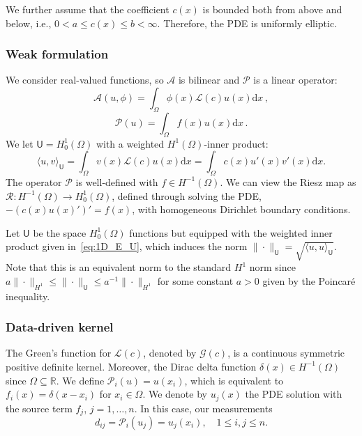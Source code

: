 \documentclass[12pt]{amsart}
\begin{document}
We further assume that the coefficient $c(x)$ is bounded both from above and below, i.e., $0 < a \leq c(x) \leq b < \infty$.  Therefore,  the PDE is uniformly elliptic.

\subsubsection{Weak formulation}
We consider real-valued functions, so $\mathcal{A}$ is bilinear and $\mathcal{P}$ is a linear operator:
$$\mathcal{A}(u,\phi) = \int_\Omega \phi(x) \mathcal{L}(c) u(x) \mathrm{d}x\,, $$
$$\mathcal{P}(u) = \int_{\Omega} f(x)u(x) \mathrm{d}x\,. $$
We let $\mathsf{U} = H_0^1(\Omega)$ with a weighted $H^{1}(\Omega)$-inner product:
\begin{equation}\label{eq:1D_E_U}
    \langle u, v\rangle_{\mathsf{U}} = \int_\Omega v(x) \mathcal{L}(c) u(x) \mathrm{d}x =  \int_{\Omega} c(x)u'(x)v'(x) \mathrm{d}x.
\end{equation}
The operator $\mathcal{P}$ is well-defined with $f \in H^{-1}(\Omega)$. We can view the Riesz map as $\mathcal{R}:H^{-1}(\Omega)\rightarrow H^{1}_0(\Omega)$, defined through solving the PDE, $ -  \left(c(x) u(x)'\right)' = f(x)$, with homogeneous Dirichlet boundary conditions. 

Let $\mathsf{U}$ be the space $H^{1}_0(\Omega)$ functions but equipped with the weighted inner product  given in~\eqref{eq:1D_E_U}, which induces the norm $\|\cdot \|_{\mathsf{U}} = \sqrt{\langle u, u \rangle_\mathsf{U}}$. Note that this is an equivalent norm to the standard $H^1$ norm since $  a \|\cdot \|_{H^1} \leq \|\cdot \|_{\mathsf{U}} \leq a^{-1} \|\cdot \|_{H^1}$ for some constant $a>0$ given by the Poincar\'e inequality.

\subsubsection{Data-driven kernel}
The Green's function for $\mathcal{L}(c)$, denoted by $\mathcal{G}(c)$, is a continuous symmetric positive definite kernel. Moreover, the Dirac delta function $\delta(x) \in H^{-1}(\Omega)$ since $\Omega \subseteq \mathbb{R}$. We define $\mathcal{P}_i (u) = u(x_i)$, which is equivalent to $f_i(x)  = \delta (x-x_i)$ for $x_i \in \Omega$. We denote by $u_j(x)$ the PDE solution with the source term $f_j$,  $j=1,\ldots, n$.   In this case, our measurements 
\[
d_{ij} = \mathcal{P}_i(u_j) = u_j (x_i), \quad 1\leq i,j \leq n.
\]
\end{document}
